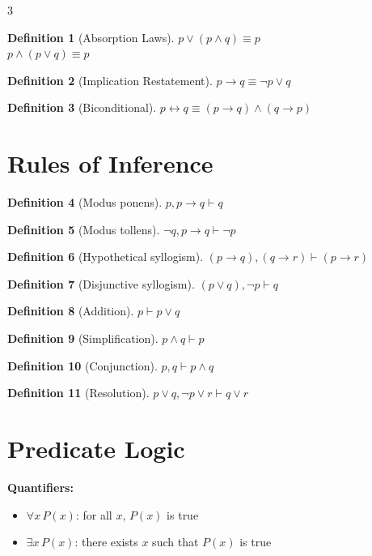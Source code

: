 \documentclass[8pt]{article}
\theoremstyle{definition}
\newtheorem*{defn}{Definition}
\begin{document}
\begin{multicols}{3}
\begin{defn}[Absorption Laws]
$p \lor (p \land q) \equiv p$\\
$p \land (p \lor q) \equiv p$

\end{defn}

\begin{defn}[Implication Restatement]
$p \to q \equiv \lnot p \lor q$
\end{defn}

\begin{defn}[Biconditional]

$p \leftrightarrow q \equiv (p \to q) \land (q \to p)$

\end{defn}
\newcolumn
\section*{Rules of Inference}
\begin{defn}[Modus ponens]
$p,p\to q \vdash q$
\end{defn}

\begin{defn}[Modus tollens]
$\lnot q,p\to q \vdash \lnot p$
\end{defn}
\begin{defn}[Hypothetical syllogism]
$(p \to q) , (q \to r) \vdash (p \to r)$
\end{defn}
\begin{defn}[Disjunctive syllogism]
$(p \lor q),\lnot p \vdash q$
\end{defn}
\begin{defn}[Addition]
$p \vdash p \lor q$
\end{defn}
\begin{defn}[Simplification]
$p \land q\vdash p$
\end{defn}
\begin{defn}[Conjunction]
$p,q \vdash p \land q$
\end{defn}
\begin{defn}[Resolution]
$p \lor q, \lnot p \lor r  \vdash q \lor r$
\end{defn}
\newcolumn
\section*{Predicate Logic}
\textbf{Quantifiers:}
\begin{itemize}[nosep]
\item $\forall x\, P(x)$: for all $x$, $P(x)$ is true
\item $\exists x\, P(x)$: there exists $x$ such that $P(x)$ is true
\end{itemize}


\end{multicols}
\end{document}
